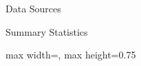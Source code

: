 \begin{frame}{Data Sources}
\end{frame}

\begin{frame}{Summary Statistics}
\begin{adjustbox}{max width=\textwidth, max height=0.75\textheight}
% 
\end{adjustbox}
\end{frame}

